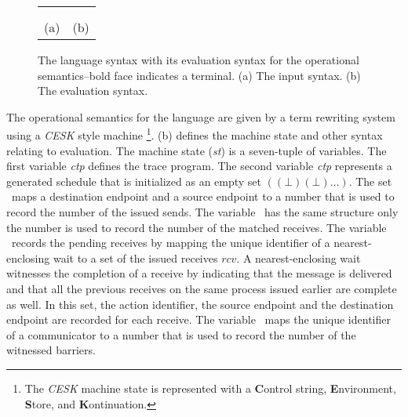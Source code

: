 \newsavebox{\boxEvalSyntax}
\begin{lrbox}{\boxEvalSyntax}
\begin{minipage}[c]{0.3\linewidth}
\cfgstart
{}
\cfgrule{\epsnd}{\cfgt{\mt}\
   \cfgor\lp\cfgnt{\epsnd}~\lb\lp\cfgt{\num},\cfgt{\num}\rp~$\rightarrow$~\cfgt{\num}\rb\rp}
\cfgrule{\eprcv}{\cfgt{\mt}\
   \cfgor\lp\cfgnt{\eprcv}~\lb\lp\cfgt{\num},\cfgt{\num}\rp~$\rightarrow$~\cfgt{\num}\rb\rp}
\cfgrule{rcv}{\lp\lb\cfgt{\aid}~\cfgt{\num}~\cfgt{\num}\rb\ \ldots\rp}
\cfgrule{\epbarrier}{\cfgt{\mt}\
   \cfgor\lp\cfgnt{\epbarrier}~\lb\cfgnt{\aid}~$\rightarrow$~\cfgt{\num}\rb\rp}
\cfgend
\end{minipage}
\end{lrbox}

\begin{figure}
\begin{center}
\setlength{\tabcolsep}{15pt}
\begin{tabular}{cc}
\scalebox{0.75}{\usebox{\boxLangSyntax}}
&
\scalebox{0.75}{\usebox{\boxEvalSyntax}}
\\ \\
(a) & (b)
\end{tabular}
\end{center}
\caption{The language syntax with its evaluation syntax for the operational semantics--bold face indicates a terminal. (a) The input syntax. (b) The evaluation syntax.}
\label{fig:expr:stx}
\end{figure}


The operational semantics for the language are given by a term rewriting system using a \textit{CESK} style machine \footnote{The \textit{CESK} machine state is represented with a \textbf{C}ontrol string, \textbf{E}nvironment, \textbf{S}tore, and \textbf{K}ontinuation.}. (b) defines the machine state and other syntax relating to evaluation. The machine state (\textit{st}) is a seven-tuple of variables. The first variable \textit{ctp} defines the trace program. The second variable \textit{ctp} represents a generated schedule that is initialized as an empty set $((\bot) (\bot) \ldots)$. The set \epsnd\ maps a destination endpoint and a source endpoint to a number that is used to record the number of the issued sends. The variable \eprcv\ has the same structure only the number is used to record the number of the matched receives. The variable \epwait\ records the pending receives by mapping the unique identifier of a nearest-enclosing wait to a set of the issued receives $\mathit{rcv}$. A nearest-enclosing wait witnesses the completion of a receive by indicating that the message is delivered and that all the previous receives on the same process issued earlier are complete as well. In this set, the action identifier, the source endpoint and the destination endpoint are recorded for each receive. The variable \epbarrier\ maps the unique identifier of a communicator to a number that is used to record the number of the witnessed barriers.
